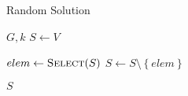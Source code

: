 \begin{algorithm}[h]
  \caption{Random Solution}\label{alg:GENETIKUS-ALGORITMUS:RANDOM-SOLUTION}
  \begin{algorithmic}[1]
    \Require $G, k$
    \State $S \leftarrow V$

    \State $elem \leftarrow \Call{Select}{S}$
    \State $S \leftarrow S \setminus \left\{ elem \right\}$
    \EndWhile

    \State \Return $S$
  \end{algorithmic}
\end{algorithm}

